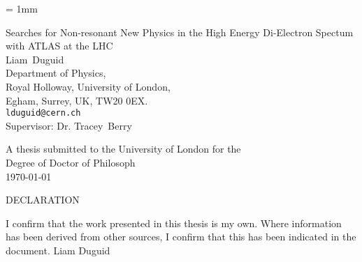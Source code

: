 \documentclass[11pt,a4paper]{report} %
\title{}
\author{}
\date{2014}
\begin{document}
\unitlength = 1mm
\begin{titlepage}

   \centering
   \vfill
   {\LARGE Searches for Non-resonant New Physics in the High Energy Di-Electron Spectum with ATLAS at the LHC}\\
   \vfill
   \vfill
   {
   {\Large Liam~Duguid}\\ 
   \vfill
   Department of Physics,\\
   Royal Holloway, University of London,\\
   Egham, Surrey, UK, TW20 0EX.\\
   \texttt{lduguid@cern.ch}\\
   \vfill
   Supervisor: Dr. Tracey~Berry\\
   }

   \vfill
   \vfill
   \vfill
   \begin{figure}[ht]
      \begin{center}
      \end{center}
   \end{figure}
   \vfill
   \vfill
   \vfill

   {A thesis submitted to the University of London for the\\
   Degree of Doctor of Philosoph}
   \\
   \vfill
   {\today\\}


\end{titlepage}


\newpage
\thispagestyle{empty}
\vspace*{\fill}
\begin{center}
{\LARGE DECLARATION} \newline
\vspace*{1cm}
\end{center}
\vspace{1cm}
I confirm that the work presented in this thesis is my own.  Where information has been derived from other sources, I confirm that this has been indicated in the document.\newline \newline \newline 
\vspace{5cm}
Liam Duguid
\vspace*{\fill}
\end{document}
